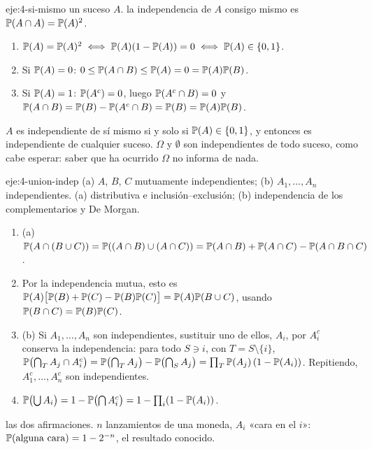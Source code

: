 \begin{solucion}{eje:4-si-mismo}
\datos un suceso $A$.
\planteamiento la independencia de $A$ consigo mismo es $\mathbb{P}(A\cap A)=\mathbb{P}(A)^{2}$.
\pasos
\begin{enumerate}[label=\arabic*.]
  \item $\mathbb{P}(A)=\mathbb{P}(A)^{2}\iff\mathbb{P}(A)(1-\mathbb{P}(A))=0\iff\mathbb{P}(A)\in\{0,1\}$.
  \item Si $\mathbb{P}(A)=0$: $0\le\mathbb{P}(A\cap B)\le\mathbb{P}(A)=0=\mathbb{P}(A)\mathbb{P}(B)$.
  \item Si $\mathbb{P}(A)=1$: $\mathbb{P}(A^{c})=0$, luego $\mathbb{P}(A^{c}\cap B)=0$ y $\mathbb{P}(A\cap B)=\mathbb{P}(B)-\mathbb{P}(A^{c}\cap B)=\mathbb{P}(B)=\mathbb{P}(A)\mathbb{P}(B)$.
\end{enumerate}
\resultado $A$ es independiente de sí mismo si y solo si $\mathbb{P}(A)\in\{0,1\}$, y entonces es independiente de cualquier suceso.
\comprobacion $\Omega$ y $\emptyset$ son independientes de todo suceso, como cabe esperar: saber que ha ocurrido $\Omega$ no informa de nada.
\end{solucion}

\begin{solucion}{eje:4-union-indep}
\datos (a) $A$, $B$, $C$ mutuamente independientes; (b) $A_1,\dots,A_n$ independientes.
\planteamiento (a) distributiva e inclusión--exclusión; (b) independencia de los complementarios y De Morgan.
\pasos
\begin{enumerate}[label=\arabic*.]
  \item (a) $\mathbb{P}(A\cap(B\cup C))=\mathbb{P}((A\cap B)\cup(A\cap C))=\mathbb{P}(A\cap B)+\mathbb{P}(A\cap C)-\mathbb{P}(A\cap B\cap C)$.
  \item Por la independencia mutua, esto es $\mathbb{P}(A)\bigl[\mathbb{P}(B)+\mathbb{P}(C)-\mathbb{P}(B)\mathbb{P}(C)\bigr]=\mathbb{P}(A)\mathbb{P}(B\cup C)$, usando $\mathbb{P}(B\cap C)=\mathbb{P}(B)\mathbb{P}(C)$.
  \item (b) Si $A_1,\dots,A_n$ son independientes, sustituir uno de ellos, $A_i$, por $A_i^{c}$ conserva la independencia: para todo $S\ni i$, con $T=S\setminus\{i\}$, $\mathbb{P}\bigl(\bigcap_{T}A_j\cap A_i^{c}\bigr)=\mathbb{P}\bigl(\bigcap_TA_j\bigr)-\mathbb{P}\bigl(\bigcap_SA_j\bigr)=\prod_T\mathbb{P}(A_j)\,(1-\mathbb{P}(A_i))$. Repitiendo, $A_1^{c},\dots,A_n^{c}$ son independientes.
  \item $\mathbb{P}\bigl(\bigcup A_i\bigr)=1-\mathbb{P}\bigl(\bigcap A_i^{c}\bigr)=1-\prod_i(1-\mathbb{P}(A_i))$.
\end{enumerate}
\resultado las dos afirmaciones.
\comprobacion $n$ lanzamientos de una moneda, $A_i$ «cara en el $i$»: $\mathbb{P}(\text{alguna cara})=1-2^{-n}$, el resultado conocido.
\end{solucion}

